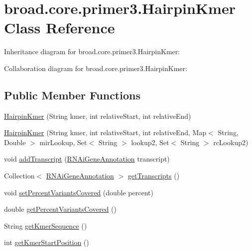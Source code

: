 \hypertarget{classbroad_1_1core_1_1primer3_1_1_hairpin_kmer}{\section{broad.\+core.\+primer3.\+Hairpin\+Kmer Class Reference}
\label{classbroad_1_1core_1_1primer3_1_1_hairpin_kmer}
}


Inheritance diagram for broad.\+core.\+primer3.\+Hairpin\+Kmer\+:


Collaboration diagram for broad.\+core.\+primer3.\+Hairpin\+Kmer\+:
\subsection*{Public Member Functions}
\begin{DoxyCompactItemize}
\item 
\hyperlink{classbroad_1_1core_1_1primer3_1_1_hairpin_kmer_ac75c6fb9a6ad5bee5f6e5cab1f2e8df1}{Hairpin\+Kmer} (String kmer, int relative\+Start, int relative\+End)
\item 
\hyperlink{classbroad_1_1core_1_1primer3_1_1_hairpin_kmer_a50ea9762f8f70ad429b48731cfb7578a}{Hairpin\+Kmer} (String kmer, int relative\+Start, int relative\+End, Map$<$ String, Double $>$ mir\+Lookup, Set$<$ String $>$ lookup2, Set$<$ String $>$ rc\+Lookup2)
\item 
void \hyperlink{classbroad_1_1core_1_1primer3_1_1_hairpin_kmer_a3e6a23489b9deb0774f03bcb42738439}{add\+Transcript} (\hyperlink{classbroad_1_1pda_1_1rnai_1_1_r_n_ai_gene_annotation}{R\+N\+Ai\+Gene\+Annotation} transcript)
\item 
Collection$<$ \hyperlink{classbroad_1_1pda_1_1rnai_1_1_r_n_ai_gene_annotation}{R\+N\+Ai\+Gene\+Annotation} $>$ \hyperlink{classbroad_1_1core_1_1primer3_1_1_hairpin_kmer_a9565c3976f7cb63bb06b2ff488f60e29}{get\+Transcripts} ()
\item 
void \hyperlink{classbroad_1_1core_1_1primer3_1_1_hairpin_kmer_aad510bc4bf2090b5d528105f223101a9}{set\+Percent\+Variants\+Covered} (double percent)
\item 
double \hyperlink{classbroad_1_1core_1_1primer3_1_1_hairpin_kmer_a2c34bc14ef01361fe29d89f287ba937e}{get\+Percent\+Variants\+Covered} ()
\item 
String \hyperlink{classbroad_1_1core_1_1primer3_1_1_hairpin_kmer_a95de1ea0f84761e1ddd1550815d5d026}{get\+Kmer\+Sequence} ()
\item 
int \hyperlink{classbroad_1_1core_1_1primer3_1_1_hairpin_kmer_addcf0acb79aed88e1534f13b138856f4}{get\+Kmer\+Start\+Position} ()

\end{DoxyCompactItemize}
